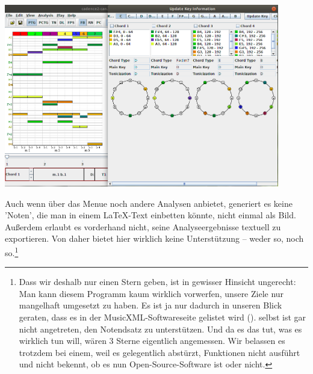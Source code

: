 \begin{center}
\includegraphics[width=0.9\textwidth]{frontends/ptolemaic/ptolemaic-2-win-300dpi.png}
\end{center}

Auch wenn  über das Menue noch andere Analysen anbietet,
generiert es keine 'Noten', die man in einem \LaTeX-Text einbetten könnte, nicht
einmal als Bild. Außerdem erlaubt es vorderhand nicht, seine Analyseergebnisse
textuell zu exportieren. Von daher bietet  hier wirklich keine
Unterstützung -- weder so, noch so.\footnote{Dass wir  deshalb
nur einen Stern geben, ist in gewisser Hinsicht ungerecht: Man kann diesem
Programm kaum wirklich vorwerfen, unsere Ziele nur mangelhaft umgesetzt zu
haben. Es ist ja nur dadurch in unseren Blick geraten, dass es in der
MusicXML-Softwareseite gelistet wird (\cite[vgl.][\nopage
wp]{MusicXML2018b}).  selbst ist gar nicht angetreten, den
Notendsatz zu unterstützen. Und da es das tut, was es wirklich tun will, wären 3
Sterne eigentlich angemessen. Wir belassen es trotzdem bei einem, weil es
gelegentlich abstürzt, Funktionen nicht ausführt und nicht bekennt, ob es nun
Open-Source-Software ist oder nicht.}

%
